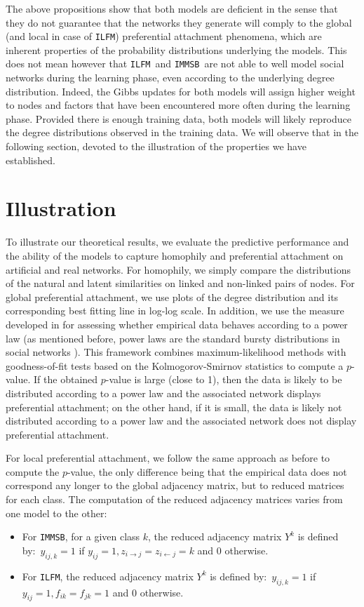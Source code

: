 \documentclass[journal]{IEEEtran}
\newcommand{\ifm}{\texttt{ILFM}}
\newcommand{\imb}{\texttt{IMMSB}}
\begin{document}
The above propositions show that both models are deficient in the sense that they do not guarantee that the networks they generate will comply to the global (and local in case of \ifm) preferential attachment phenomena, which are inherent properties of the probability distributions underlying the models. This does not mean however that \ifm\ and \imb\ are not able to well model social networks during the learning phase, even according to the underlying degree distribution. Indeed, the Gibbs updates for both models will assign higher weight to nodes and factors that have been encountered more often during the learning phase. Provided there is enough training data, both models will likely reproduce the degree distributions observed in the training data. We will observe that in the following section, devoted to the illustration of the properties we have established.

\section{Illustration}
\label{sec:exps}

To illustrate our theoretical results, we evaluate the predictive performance and the ability of the models to capture homophily and preferential attachment on artificial and real networks. For homophily, we simply compare the distributions of the natural and latent similarities on linked and non-linked pairs of nodes. For global preferential attachment, we use plots of the degree distribution and its corresponding best fitting line in log-log scale. In addition, we use the measure developed in \cite{clauset2009power} for assessing whether empirical data behaves according to a power law (as mentioned before, power laws are the standard bursty distributions in social networks \cite{barabasi1999emergence}). This framework combines maximum-likelihood methods with goodness-of-fit tests based on the Kolmogorov-Smirnov statistics to compute a $p$-value. If the obtained $p$-value is large (close to 1), then the data is likely to be distributed according to a power law and the associated network displays preferential attachment;  on the other hand, if it is small, the data is likely not distributed according to a power law and the associated network does not display preferential attachment.

For local preferential attachment, we follow the same approach as before to compute the $p$-value, the only difference being that the empirical data does not correspond any longer to the global adjacency matrix, but to reduced matrices for each class. The computation of the reduced adjacency matrices varies from one model to the other:
%
\begin{itemize}
    \item For \imb, for a given class $k$, the reduced adjacency matrix $Y^k$ is defined by:~$y_{ij,k}=1$ if $y_{ij}=1, z_{i\rightarrow j}=z_{i\leftarrow j}=k$ and $0$ otherwise.
    \item For \ifm, the reduced adjacency matrix $Y^k$ is defined by:~$ y_{ij,k}=1$ if $y_{ij}=1 , f_{ik}=f_{jk}=1$ and $0$ otherwise.
\end{itemize}
%
\end{document}
